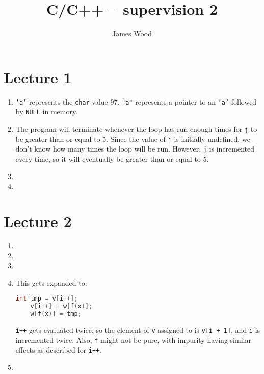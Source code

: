 \documentclass{article}
\begin{document}
\title{C/C++ -- supervision 2}
\author{James Wood}
\maketitle

\section{Lecture 1}
\begin{enumerate}
  \item \texttt{'a'} represents the \texttt{char} value 97. \texttt{"a"} represents a pointer to an \texttt{'a'} followed by \texttt{NULL} in memory.

  \item The program will terminate whenever the loop has run enough times for \texttt{j} to be greater than or equal to 5. Since the value of \texttt{j} is initially undefined, we don't know how many times the loop will be run. However, \texttt{j} is incremented every time, so it will eventually be greater than or equal to 5.
  \item 

  \item 
\end{enumerate}

\section{Lecture 2}
\begin{enumerate}
  \item 

  \item 

  \item 

  \item
    This gets expanded to:
    \begin{lstlisting}[language=C]
    int tmp = v[i++];
    v[i++] = w[f(x)];
    w[f(x)] = tmp;
    \end{lstlisting}
    \texttt{i++} gets evaluated twice, so the element of \texttt{v} assigned to is \texttt{v[i + 1]}, and \texttt{i} is incremented twice. Also, \texttt{f} might not be pure, with impurity having similar effects as described for \texttt{i++}.

  \item 
\end{enumerate}
\end{document}
